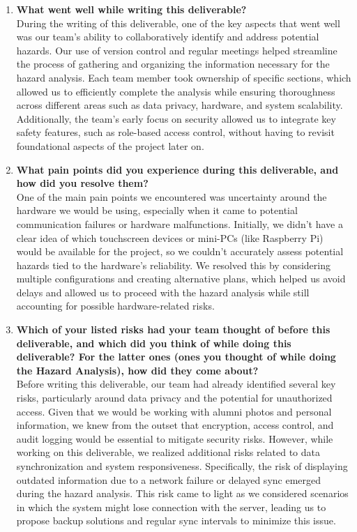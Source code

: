 \documentclass{article}
\begin{document}
\begin{enumerate}
  \item \textbf{What went well while writing this deliverable?} \\
  During the writing of this deliverable, one of the key aspects that went well was our team’s ability to collaboratively identify and address potential hazards. Our use of version control and regular meetings helped streamline the process of gathering and organizing the information necessary for the hazard analysis. Each team member took ownership of specific sections, which allowed us to efficiently complete the analysis while ensuring thoroughness across different areas such as data privacy, hardware, and system scalability. Additionally, the team’s early focus on security allowed us to integrate key safety features, such as role-based access control, without having to revisit foundational aspects of the project later on.
  
  \item \textbf{What pain points did you experience during this deliverable, and how did you resolve them?} \\
  One of the main pain points we encountered was uncertainty around the hardware we would be using, especially when it came to potential communication failures or hardware malfunctions. Initially, we didn’t have a clear idea of which touchscreen devices or mini-PCs (like Raspberry Pi) would be available for the project, so we couldn’t accurately assess potential hazards tied to the hardware’s reliability. We resolved this by considering multiple configurations and creating alternative plans, which helped us avoid delays and allowed us to proceed with the hazard analysis while still accounting for possible hardware-related risks.

  \item \textbf{Which of your listed risks had your team thought of before this deliverable, and which did you think of while doing this deliverable? For the latter ones (ones you thought of while doing the Hazard Analysis), how did they come about?} \\
  Before writing this deliverable, our team had already identified several key risks, particularly around data privacy and the potential for unauthorized access. Given that we would be working with alumni photos and personal information, we knew from the outset that encryption, access control, and audit logging would be essential to mitigate security risks. However, while working on this deliverable, we realized additional risks related to data synchronization and system responsiveness. Specifically, the risk of displaying outdated information due to a network failure or delayed sync emerged during the hazard analysis. This risk came to light as we considered scenarios in which the system might lose connection with the server, leading us to propose backup solutions and regular sync intervals to minimize this issue.


\end{enumerate}
\end{document}
